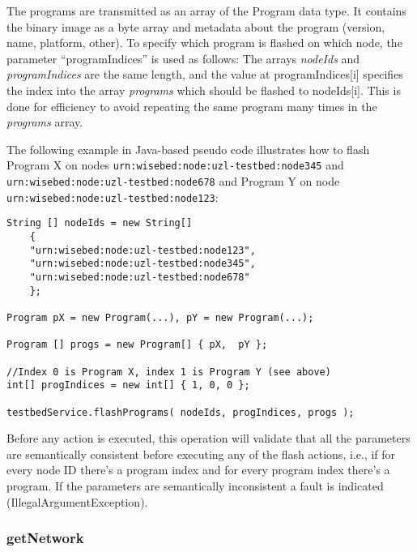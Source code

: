 The programs are transmitted as an array of the Program data type. It contains the binary image as a byte array and metadata about the program (version, name, platform, other). To specify which program is flashed on which node, the parameter ``programIndices'' is used as follows: The arrays {\em nodeIds} and {\em programIndices} are the same length, and the value at programIndices[i] specifies the index into the array {\em programs} which should be flashed to nodeIds[i]. This is done for efficiency to avoid repeating the same program many times in the {\em programs} array.

The following example in Java-based pseudo code illustrates how to flash Program X on nodes \lstinline{urn:wisebed:node:uzl-testbed:node345} and \lstinline{urn:wisebed:node:uzl-testbed:node678} and Program Y on node \lstinline{urn:wisebed:node:uzl-testbed:node123}: 
 
\begin{lstlisting}
String [] nodeIds = new String[] 
	{  
	"urn:wisebed:node:uzl-testbed:node123", 
	"urn:wisebed:node:uzl-testbed:node345", 
	"urn:wisebed:node:uzl-testbed:node678" 
	}; 
	
Program pX = new Program(...), pY = new Program(...); 

Program [] progs = new Program[] { pX,  pY }; 

//Index 0 is Program X, index 1 is Program Y (see above) 
int[] progIndices = new int[] { 1, 0, 0 }; 

testbedService.flashPrograms( nodeIds, progIndices, progs ); 
\end{lstlisting}

Before any action is executed, this operation will validate that all the parameters are semantically consistent before executing any of the flash actions, i.e., if for every node ID there's a program index and for every program index there's a program. If the parameters are semantically inconsistent a fault is indicated (IllegalArgumentException). 

			\subsubsection{getNetwork}

